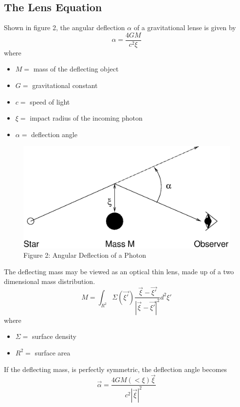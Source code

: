 \documentclass[a4paper]{IEEEtran}
\begin{document}
\subsection{The Lens Equation}
Shown in figure 2, the angular deflection $\alpha$ of a 
gravitational lense is given by
\begin{equation}    
    \alpha = \frac{4GM}{c^2 \xi}
\end{equation}
where
\begin{itemize}
    \item $M = $ mass of the deflecting object
    \item $G = $ gravitational constant
    \item $c = $ speed of light
    \item $\xi = $ impact radius of the incoming photon
    \item $\alpha = $ deflection angle
\end{itemize}

\begin{figure}
    \begin{center}
        \caption{Figure 2: Angular Deflection of a Photon} 
        \label{fig:photon} 
        \includegraphics[width=0.9\columnwidth]{images/gldiag.eps}
    \end{center}
\end{figure}

The deflecting mass may be viewed as an optical thin lens, made up
of a two dimensional mass distribution.
\begin{equation}
    M = \int_{R^2} \Sigma(\vec{\xi '}) 
        \frac{\vec{\xi} - \vec{\xi '} }{|\vec{\xi} - \vec{\xi '}|^2} d^2 \xi '
\end{equation}
where
\begin{itemize}
    \item $\Sigma = $ surface density
    \item $R^2 = $ surface area
\end{itemize}
If the deflecting mass, is perfectly symmetric, the deflection angle becomes
\begin{equation}
    \vec{\alpha} = \frac{4GM(<\xi)\vec{\xi}}{c^2|\vec{\xi}|^2}
\end{equation}
\end{document}
